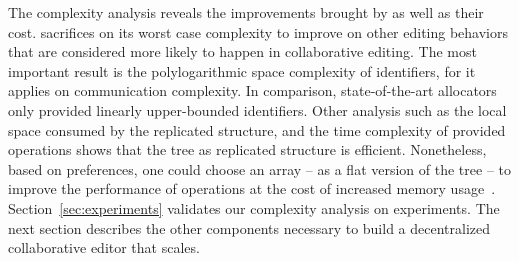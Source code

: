 The complexity analysis reveals the improvements brought by \LSEQ as well as
their cost.  \LSEQ sacrifices on its worst case complexity to improve on other
editing behaviors that are considered more likely to happen in collaborative
editing. The most important result is the polylogarithmic space complexity of
identifiers, for it applies on communication complexity. In comparison,
state-of-the-art allocators~\cite{preguica2009commutative, weiss2009logoot} only
provided linearly upper-bounded identifiers. Other analysis such as the local
space consumed by the replicated structure, and the time complexity of provided
operations shows that the tree as replicated structure is
efficient. Nonetheless, based on preferences, one could choose an array -- as a
flat version of the tree -- to improve the performance of operations at the cost
of increased memory usage~\cite{weiss2009logoot}.  Section~\ref{sec:experiments}
validates our complexity analysis on experiments. The next section describes the
other components necessary to build a decentralized collaborative editor that
scales.


